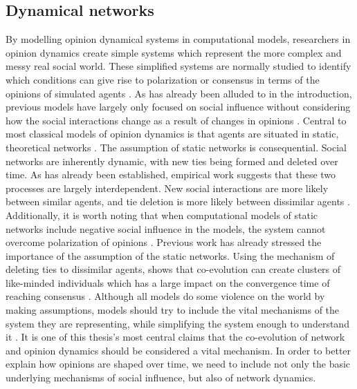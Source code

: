 \documentclass[11pt]{article}
\begin{document}
\subsection{Dynamical networks}
By modelling opinion dynamical systems in computational models, researchers in opinion dynamics create simple systems which represent the more complex and messy real social world. These simplified systems are normally studied to identify which conditions can give rise to polarization or consensus in terms of the opinions of simulated agents \cite{flache_models_2017}. As has already been alluded to in the introduction, previous models have largely only focused on social influence without considering how the social interactions change as a result of changes in opinions \cite{galesic_integrating_2021,holme_nonequilibrium_2006,jalili_coevolution_2015}. Central to most classical models of opinion dynamics is that agents are situated in static, theoretical networks \cite{flache_models_2017}. The assumption of static networks is consequential. Social networks are inherently dynamic, with new ties being formed and deleted over time. As has already been established, empirical work suggests that these two processes are largely interdependent. New social interactions are more likely between similar agents, and tie deletion is more likely between dissimilar agents \cite{kossinets_origins_2009, bener_empirical_2016}. Additionally, it is worth noting that when computational models of static networks include negative social influence in the models, the system cannot overcome polarization of opinions \cite{flache_models_2017, kozma2008consensus}. Previous work has already stressed the importance of the assumption of the static networks. Using the mechanism of deleting ties to dissimilar agents,  shows that co-evolution can create clusters of like-minded individuals which has a large impact on the convergence time of reaching consensus \cite{kozma2008consensus}. 
Although all models do some violence on the world by making assumptions, models should try to include the vital mechanisms of the system they are representing, while simplifying the system enough to understand it \cite{epstein1999agent,smaldino_models_2016}. It is one of this thesis's most central claims that the co-evolution of network and opinion dynamics should be considered a vital mechanism. In order to better explain how opinions are shaped over time, we need to include not only the basic underlying mechanisms of social influence, but also of network dynamics. 
\end{document}
